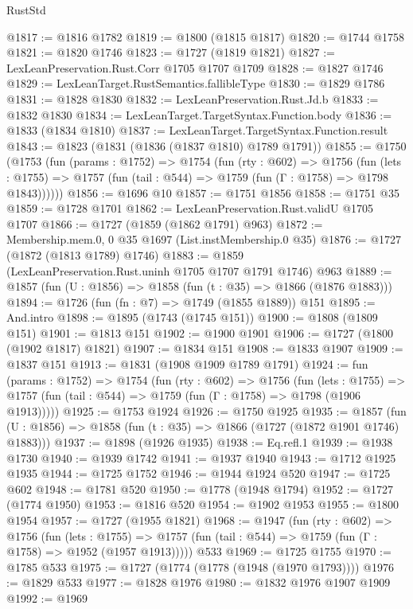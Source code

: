 \begin{lexlean}{RustStd}
\begin{coremodule}
@1817 := @1816 @1782
@1819 := @1800 (@1815 @1817)
@1820 := @1744 @1758
@1821 := @1820 @1746
@1823 := @1727 (@1819 @1821)
@1827 := LexLeanPreservation.Rust.Corr @1705 @1707 @1709
@1828 := @1827 @1746
@1829 := LexLeanTarget.RustSemantics.fallibleType
@1830 := @1829 @1786
@1831 := @1828 @1830
@1832 := LexLeanPreservation.Rust.Jd.b
@1833 := @1832 @1830
@1834 := LexLeanTarget.TargetSyntax.Function.body
@1836 := @1833 (@1834 @1810)
@1837 := LexLeanTarget.TargetSyntax.Function.result
@1843 := @1823 (@1831 (@1836 (@1837 @1810) @1789 @1791))
@1855 := @1750
    (@1753
      (fun (params : @1752) =>
      @1754
        (fun (rty : @602) =>
        @1756
          (fun (lets : @1755) =>
          @1757 (fun (tail : @544) => @1759 (fun (Γ : @1758) => @1798 @1843))))))
@1856 := @1696 @10
@1857 := @1751 @1856
@1858 := @1751 @35
@1859 := @1728 @1701
@1862 := LexLeanPreservation.Rust.validU @1705 @1707
@1866 := @1727 (@1859 (@1862 @1791) @963)
@1872 := Membership.mem.{0, 0} @35 @1697 (List.instMembership.{0} @35)
@1876 := @1727 (@1872 (@1813 @1789) @1746)
@1883 := @1859 (LexLeanPreservation.Rust.uninh @1705 @1707 @1791 @1746) @963
@1889 := @1857 (fun (U : @1856) => @1858 (fun (t : @35) => @1866 (@1876 @1883)))
@1894 := @1726 (fun (fn : @7) => @1749 (@1855 @1889)) @151
@1895 := And.intro
@1898 := @1895 (@1743 (@1745 @151))
@1900 := @1808 (@1809 @151)
@1901 := @1813 @151
@1902 := @1900 @1901
@1906 := @1727 (@1800 (@1902 @1817) @1821)
@1907 := @1834 @151
@1908 := @1833 @1907
@1909 := @1837 @151
@1913 := @1831 (@1908 @1909 @1789 @1791)
@1924 := fun (params : @1752) =>
  @1754
    (fun (rty : @602) =>
    @1756
      (fun (lets : @1755) =>
      @1757 (fun (tail : @544) => @1759 (fun (Γ : @1758) => @1798 (@1906 @1913)))))
@1925 := @1753 @1924
@1926 := @1750 @1925
@1935 := @1857 (fun (U : @1856) => @1858 (fun (t : @35) => @1866 (@1727 (@1872 @1901 @1746) @1883)))
@1937 := @1898 (@1926 @1935)
@1938 := Eq.refl.{1}
@1939 := @1938 @1730
@1940 := @1939 @1742
@1941 := @1937 @1940
@1943 := @1712 @1925 @1935
@1944 := @1725 @1752
@1946 := @1944 @1924 @520
@1947 := @1725 @602
@1948 := @1781 @520
@1950 := @1778 (@1948 @1794)
@1952 := @1727 (@1774 @1950)
@1953 := @1816 @520
@1954 := @1902 @1953
@1955 := @1800 @1954
@1957 := @1727 (@1955 @1821)
@1968 := @1947
    (fun (rty : @602) =>
    @1756
      (fun (lets : @1755) =>
      @1757 (fun (tail : @544) => @1759 (fun (Γ : @1758) => @1952 (@1957 @1913)))))
    @533
@1969 := @1725 @1755
@1970 := @1785 @533
@1975 := @1727 (@1774 (@1778 (@1948 (@1970 @1793))))
@1976 := @1829 @533
@1977 := @1828 @1976
@1980 := @1832 @1976 @1907 @1909
@1992 := @1969

\end{coremodule}
\end{lexlean}
